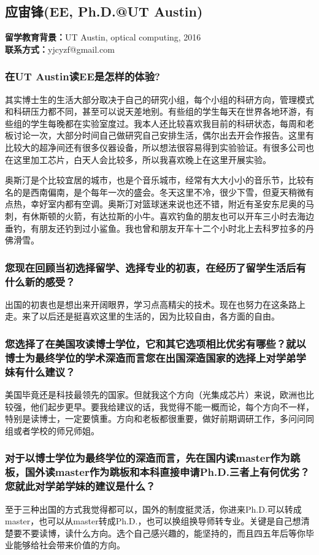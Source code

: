 \documentclass[a4paper,UTF8]{book}
\begin{document}
\clearpage
\subsection{应宙锋(EE, Ph.D.@UT Austin)}
    \textbf{留学教育背景：}UT Austin, optical computing, 2016\\
    \textbf{联系方式：}yjcyzf@gmail.com

    \subsubsection*{在UT Austin读EE是怎样的体验?}
    其实博士生的生活大部分取决于自己的研究小组，每个小组的科研方向，管理模式和科研压力都不同，甚至可以说天差地别。有些组的学生每天在世界各地环游，有些组的学生每晚都在实验室度过。我本人还比较喜欢我目前的科研状态，每周和老板讨论一次，大部分时间自己做研究自己安排生活，偶尔出去开会作报告。这里有比较大的超净间还有很多仪器设备，所以想法很容易得到实验验证。有很多公司也在这里加工芯片，白天人会比较多，所以我喜欢晚上在这里开展实验。
    
    奥斯汀是个比较宜居的城市，也是个音乐城市，经常有大大小小的音乐节，比较有名的是西南偏南，是个每年一次的盛会。冬天这里不冷，很少下雪，但夏天稍微有点热，幸好室内都有空调。奥斯汀对篮球迷来说也还不错，附近有圣安东尼奥的马刺，有休斯顿的火箭，有达拉斯的小牛。喜欢钓鱼的朋友也可以开车三小时去海边垂钓，有朋友还钓到过小鲨鱼。我也曾和朋友开车十二个小时北上去科罗拉多的丹佛滑雪。    
    
    \subsubsection*{您现在回顾当初选择留学、选择专业的初衷，在经历了留学生活后有什么新的感受？}
    出国的初衷也是想出来开阔眼界，学习点高精尖的技术。现在也努力在这条路上走。来了以后还是挺喜欢这里的生活的，因为比较自由，各方面的自由。
    
    \subsubsection*{您选择了在美国攻读博士学位，它和其它选项相比优劣有哪些？就以博士为最终学位的学术深造而言您在出国深造国家的选择上对学弟学妹有什么建议？}
    美国毕竟还是科技最领先的国家。但就我这个方向（光集成芯片）来说，欧洲也比较强，他们起步更早。要我给建议的话，我觉得不能一概而论，每个方向不一样，特别是读博士，一定要慎重。方向和老板都很重要，做好前期调研工作，多问问同组或者学校的师兄师姐。

    \subsubsection*{对于以博士学位为最终学位的深造而言，先在国内读master作为跳板，国外读master作为跳板和本科直接申请Ph.D.三者上有何优劣？您就此对学弟学妹的建议是什么？}
    至于三种出国的方式我觉得都可以，国外的制度挺灵活，你进来Ph.D.可以转成master，也可以从master转成Ph.D.，也可以换组换导师转专业。关键是自己想清楚要不要读博，读什么方向。选个自己感兴趣的，能坚持的，而且四五年后等你毕业能够给社会带来价值的方向。
\end{document}
